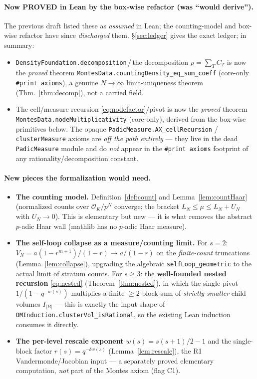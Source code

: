\documentclass[11pt]{article}
\theoremstyle{definition}
\theoremstyle{remark}
\newcommand{\OK}{\mathcal{O}_K}
\begin{document}
\paragraph{Now PROVED in Lean by the box-wise refactor (was ``would derive'').}
The previous draft listed these as \emph{assumed} in Lean; the counting-model and
box-wise refactor have since \emph{discharged} them. \S\ref{sec:ledger} gives the
exact ledger; in summary:
\begin{itemize}[nosep]
\item \texttt{DensityFoundation.decomposition}\,/\,the decomposition
$\rho=\sum_T C_T$ is now the \emph{proved} theorem
\texttt{MontesData.countingDensity\_eq\_sum\_coeff} (core-only \texttt{\#print
axioms}), a genuine $N\to\infty$ limit-uniqueness theorem (Thm.~\ref{thm:decomp}),
not a carried field.
\item The cell/measure recursion \eqref{eq:nodefactor}$/$pivot is now the
\emph{proved} theorem \texttt{MontesData.nodeMultiplicativity} (core-only), derived
from the box-wise primitives below. The opaque \texttt{PadicMeasure.AX\_cellRecursion}
/ \texttt{clusterMeasure} axioms are \emph{off the path entirely} --- they live in
the dead \texttt{PadicMeasure} module and do \emph{not} appear in the
\texttt{\#print axioms} footprint of any rationality/decomposition constant.
\end{itemize}

\paragraph{New pieces the formalization would need.}
\begin{itemize}[nosep]
\item \textbf{The counting model.} Definition~\ref{def:count} and
Lemma~\ref{lem:countHaar} (normalized counts over $\OK/p^N$ converge; the
bracket $L_N\le\mu\le L_N+U_N$ with $U_N\to0$). This is elementary but new ---
it is what removes the abstract $p$-adic Haar wall (mathlib has no $p$-adic Haar
measure).
\item \textbf{The self-loop collapse as a measure/counting limit.} For $s=2$:
$V_N=a(1-r^{m+1})/(1-r)\to a/(1-r)$ on the \emph{finite-count} truncations
(Lemma~\ref{lem:collapse}), upgrading the algebraic \texttt{selfLoop\_geometric} to
the actual limit of stratum counts. For $s\ge3$: the \textbf{well-founded nested
recursion} \eqref{eq:nested} (Theorem~\ref{thm:nested}), in which the single pivot
$1/(1-q^{-w(s)})$ multiplies a finite $\ge2$-block sum of \emph{strictly-smaller}
child volumes $I_{|B|}$ --- this is exactly the input shape of
\texttt{OMInduction.clusterVol\_isRational}, so the existing Lean induction consumes
it directly.
\item \textbf{The per-level rescale exponent} $w(s)=s(s+1)/2-1$ and the single-block
factor $r(s)=q^{-\delta w(s)}$ (Lemma~\ref{lem:rescale}), the R1 Vandermonde/Jacobian
input --- a separately proved elementary computation, \emph{not} part of the Montes
axiom (flag C1).
\end{itemize}
\end{document}

